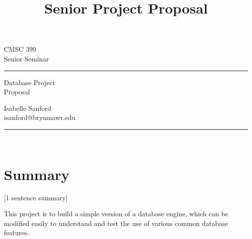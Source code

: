 \documentclass[12pt, oneside]{amsart} %
\begin{document}

\title{Senior Project Proposal} %

\begin{minipage}{0.295\textwidth} %
\raggedright
CMSC 399\\ %
\footnotesize %
Senior Seminar %
\medskip\hrule
\end{minipage}
\begin{minipage}{0.4\textwidth} %
\centering 
\large %
Database Project\\ %
\normalsize 
Proposal \\ %
\end{minipage}
\begin{minipage}{0.295\textwidth} %
\raggedleft
Isabelle Sanford \\%
\footnotesize 
isanford@brynmawr.edu
\medskip\hrule
\end{minipage}\\

\section{Summary}

[1 sentence summary]

This project is to build a simple version of a database engine, which can be modified easily to understand and test the use of various common database features. 
\end{document}
